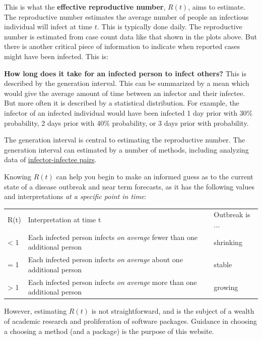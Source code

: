 \documentclass[
  letterpaper,
  DIV=11,
  numbers=noendperiod]{scrreprt}
\begin{document}
This is what the \textbf{effective reproductive number}, \(R(t)\), aims
to estimate. The reproductive number estimates the average number of
people an infectious individual will infect at time \(t\). This is
typically done daily. The reproductive number is estimated from case
count data like that shown in the plots above. But there is another
critical piece of information to indicate when reported cases might have
been infected. This is:

\textbf{How long does it take for an infected person to infect others?}
This is described by the generation interval. This can be summarized by
a mean which would give the average amount of time between an infector
and their infectee. But more often it is described by a statistical
distribution. For example, the infector of an infected individual would
have been infected 1 day prior with 30\% probability, 2 days prior with
40\% probability, or 3 days prior with probability.

The generation interval is central to estimating the reproductive
number. The generation interval can estimated by a number of methods,
including analyzing data of
\href{https://journals.lww.com/epidem/FullText/2009/05000/Estimation_of_the_Serial_Interval_of_Influenza.7.aspx?casa_token=ryVMHOD5AEgAAAAA:dTLXhhBPGA_sFo1yyON5_GDSwqV7cvMxb7p7FJAfHlO3OnpLfbTDLdgiWKNNz3_P4rQm18po9HSte9PtG_Sa0MQKRL0}{infector-infectee
pairs}.

Knowing \(R(t)\) can help you begin to make an informed guess as to the
current state of a disease outbreak and near term forecasts, as it has
the following values and interpretations \emph{at a specific point in
time}:

\begin{longtable}[]{@{}lll@{}}
\toprule\noalign{}
\endhead
\bottomrule\noalign{}
\endlastfoot
R(t) & Interpretation at time t & Outbreak is ... \\
\textless{} 1 & Each infected person infects \emph{on average} fewer
than one additional person & shrinking \\
= 1 & Each infected person infects \emph{on average} about one
additional person & stable \\
\textgreater{} 1 & Each infected person infects \emph{on average} more
than one additional person & growing \\
\end{longtable}

However, estimating \(R(t)\) is not straightforward, and is the subject
of a wealth of academic research and proliferation of software packages.
Guidance in choosing a choosing a method (and a package) is the purpose
of this website.
\end{document}

